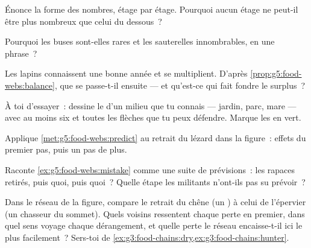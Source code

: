 \begin{exercise}[$\star$]\label{exo:g5:food-webs:5}
Énonce la forme des nombres, étage par étage. Pourquoi aucun étage
ne peut-il être plus nombreux que celui du dessous~?
\end{exercise}

\begin{exercise}[$\star$]\label{exo:g5:food-webs:6}
Pourquoi les buses sont-elles rares et les sauterelles innombrables,
en une phrase~?
\end{exercise}

\begin{exercise}[$\star$]\label{exo:g5:food-webs:7}
Les lapins connaissent une bonne année et se multiplient. D'après
\cref{prop:g5:food-webs:balance}, que se passe-t-il ensuite --- et
qu'est-ce qui fait fondre le surplus~?
\end{exercise}

\begin{exercise}[$\star$]\label{exo:g5:food-webs:8}
À toi d'essayer~: dessine le  d'un milieu que tu
connais --- jardin, parc, mare --- avec au moins six  et
toutes les flèches que tu peux défendre. Marque les  en
vert.
\end{exercise}

\begin{exercise}[$\star\star$]\label{exo:g5:food-webs:9}
Applique \cref{met:g5:food-webs:predict} au retrait du lézard dans
la figure~: effets du premier pas, puis un pas de plus.
\end{exercise}

\begin{exercise}[$\star\star$]\label{exo:g5:food-webs:10}
Raconte \cref{ex:g5:food-webs:mistake} comme une suite de
prévisions~: les rapaces retirés, puis quoi, puis quoi~? Quelle
étape les militants n'ont-ils pas su prévoir~?
\end{exercise}

\begin{exercise}[$\star\star\star$]\label{exo:g5:food-webs:11}
Dans le réseau de la figure, compare le retrait du chêne (un
) à celui de l'épervier (un chasseur du sommet). Quels
voisins ressentent chaque perte en premier, dans quel sens voyage
chaque dérangement, et quelle perte le réseau encaisse-t-il ici le
plus facilement~? Sers-toi de
\cref{ex:g3:food-chains:dry,ex:g3:food-chains:hunter}.
\end{exercise}

